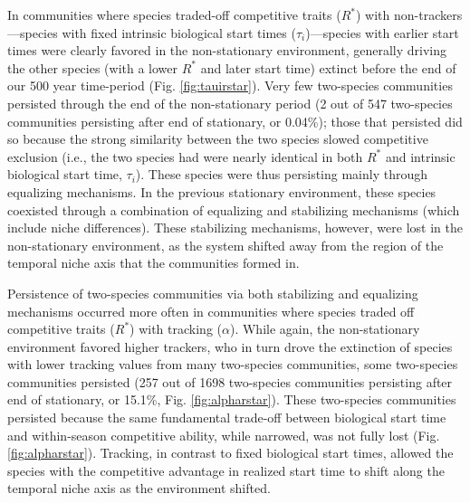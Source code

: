 \documentclass[11pt,letterpaper]{article}
\begin{document}
In communities where species traded-off competitive traits ($R^*$) with non-trackers---species with fixed intrinsic biological start times ($\tau_i$)---species with earlier start times were clearly favored in the non-stationary environment, generally driving the other species (with a lower $R^*$ and later start time) extinct before the end of our 500 year time-period (Fig. \ref{fig:tauirstar}). Very few two-species communities persisted through the end of the non-stationary period (2 out of 547 two-species communities persisting after end of stationary, or 0.04\%); those that persisted did so because the strong similarity between the two species slowed competitive exclusion (i.e., the two species had were nearly identical in both $R^*$ and intrinsic biological start time, $\tau_i$). These species were thus persisting mainly through equalizing mechanisms. In the previous stationary environment, these species coexisted through a combination of equalizing and stabilizing mechanisms (which include niche differences). These stabilizing mechanisms, however, were lost in the non-stationary environment, as the system shifted away from the region of the temporal niche axis that the communities formed in. 

Persistence of two-species communities via both stabilizing and equalizing mechanisms occurred more often in communities where species traded off competitive traits ($R^*$) with tracking ($\alpha$). While again, the non-stationary environment favored higher trackers, who in turn drove the extinction of species with lower tracking values from many two-species communities, some two-species communities persisted (257 out of 1698 two-species communities persisting after end of stationary, or 15.1\%, Fig. \ref{fig:alpharstar}). These two-species communities persisted because the same fundamental trade-off between biological start time and within-season competitive ability, while narrowed, was not fully lost (Fig. \ref{fig:alpharstar}). Tracking, in contrast to fixed biological start times, allowed the species with the competitive advantage in realized start time to shift along the temporal niche axis as the environment shifted.  
\end{document}
